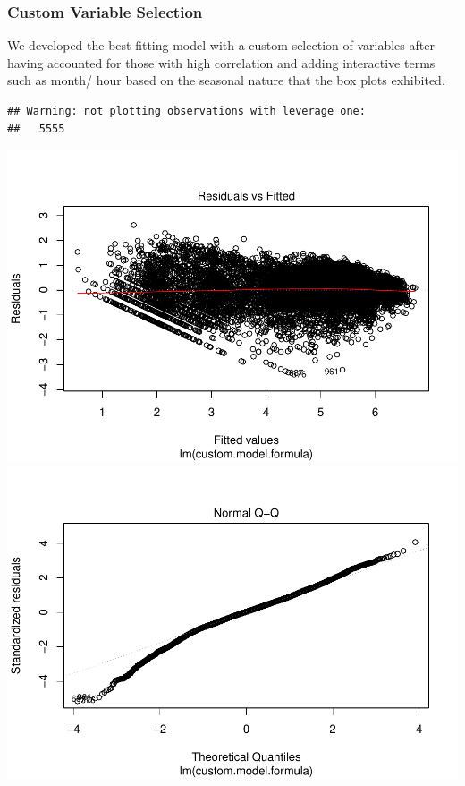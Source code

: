 \documentclass[american,]{article}
\begin{document}
\hypertarget{custom-variable-selection}{%
\subsubsection{Custom Variable Selection}\label{custom-variable-selection}}

We developed the best fitting model with a custom selection of variables after having accounted for those with high correlation and adding interactive terms such as month/ hour based on the seasonal nature that the box plots exhibited.

\begin{verbatim}
## Warning: not plotting observations with leverage one:
##   5555
\end{verbatim}

\includegraphics{BikeSharingDemand_files/figure-latex/custom-model-1.pdf} \includegraphics{BikeSharingDemand_files/figure-latex/custom-model-2.pdf}
\end{document}
